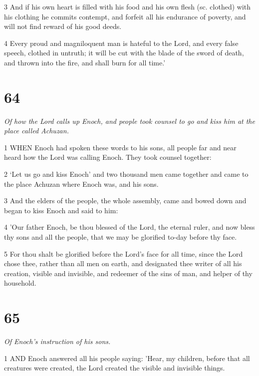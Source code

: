 \par 3 And if his own heart is filled with his food and his own flesh (sc. clothed) with his clothing he commits contempt, and forfeit all his endurance of poverty, and will not find reward of his good deeds.

\par 4 Every proud and magniloquent man is hateful to the Lord, and every false speech, clothed in untruth; it will be cut with the blade of the sword of death, and thrown into the fire, and shall burn for all time.'

\chapter{64}

\par \textit{Of how the Lord calls up Enoch, and people took counsel to go and kiss him at the place called Achuzan.}

\par 1 WHEN Enoch had spoken these words to his sons, all people far and near heard how the Lord was calling Enoch. They took counsel together:

\par 2 ‘Let us go and kiss Enoch’ and two thousand men came together and came to the place Achuzan where Enoch was, and his sons.

\par 3 And the elders of the people, the whole assembly, came and bowed down and began to kiss Enoch and said to him:

\par 4 'Our father Enoch, be thou blessed of the Lord, the eternal ruler, and now bless thy sons and all the people, that we may be glorified to-day before thy face.

\par 5 For thou shalt be glorified before the Lord's face for all time, since the Lord chose thee, rather than all men on earth, and designated thee writer of all his creation, visible and invisible, and redeemer of the sins of man, and helper of thy household.

\chapter{65}

\par \textit{Of Enoch's instruction of his sons.}

\par 1 AND Enoch answered all his people saying: 'Hear, my children, before that all creatures were created, the Lord created the visible and invisible things.

